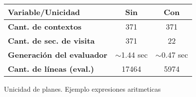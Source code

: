\begin{figure}[h!]
    \begin{center}
        \setlength{\doublerulesep}{0mm}
        \setlength{\arrayrulewidth}{0.9pt}
        \begin{tabular}{|l||c|c|}
            \hline
            \rowcolor{gris} \textbf{Variable/Unicidad}&\textbf{Sin} & \textbf{Con} \\ \hline
            \rowcolor{white}\textbf{Cant. de contextos}           & 371                        & 371                         \\ \hline
            \rowcolor{white}\textbf{Cant. de sec. de visita }  & \color{red}371             & \color{blue}22              \\ \hline
            \rowcolor{white}\textbf{Generación del evaluador}  & \color{red} $\sim$1.44 sec & \color{blue} $\sim$0.47 sec \\ \hline
            \rowcolor{white}\textbf{Cant. de líneas (eval.)}   & \color{red}17464           & \color{blue}5974            \\ \hline
        \end{tabular}
    \end{center}
    \caption{\label{fig:uni_plan}Unicidad de planes. Ejemplo expresiones aritmeticas}
\end{figure}